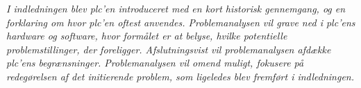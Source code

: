 \textit{I indledningen blev \gls{plc}'en introduceret med en kort historisk gennemgang, og en forklaring om hvor \gls{plc}'en oftest anvendes. Problemanalysen vil grave ned i \gls{plc}'ens hardware og software, hvor formålet er at belyse, hvilke potentielle problemstillinger, der foreligger. Afslutningsvist vil problemanalysen afdække \gls{plc}'ens begrænsninger. Problemanalysen vil omend muligt, fokusere på redegørelsen af det initierende problem, som ligeledes blev fremført i indledningen.}


